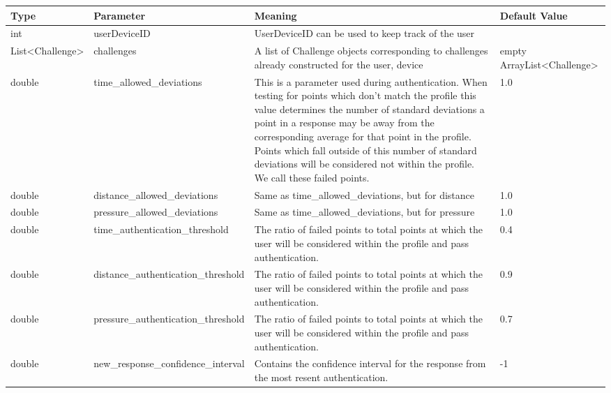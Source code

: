 \documentclass{article} %
\begin{document}
\begin{table}[H]
\centering
\begin{tabular}{ | l | l | p{6.5cm} | p{3cm}|}
\hline

Type & Parameter & Meaning & Default Value \\ \hline

int & userDeviceID & UserDeviceID can be used to keep track of the user & \\ \hline

List\textless Challenge\textgreater & challenges & A list of Challenge objects corresponding to challenges already constructed for the user, device & empty ArrayList\textless Challenge\textgreater \\ \hline

double & time\_allowed\_deviations & This is a parameter used during authentication. When testing for points which don't match the profile this value determines the number of standard deviations a point in a response may be away from the corresponding average for that point in the profile. 
Points which fall outside of this number of standard deviations will be considered not within the profile.
We call these failed points. & 1.0 \\ \hline

double & distance\_allowed\_deviations & Same as time\_allowed\_deviations, but for distance& 1.0 \\ \hline

double & pressure\_allowed\_deviations & Same as time\_allowed\_deviations, but for pressure& 1.0 \\ \hline

double & time\_authentication\_threshold & The ratio of failed points to total points at which the user will be considered within the profile and pass authentication. & 0.4 \\ \hline

double & distance\_authentication\_threshold & The ratio of failed points to total points at which the user will be considered within the profile and pass authentication. & 0.9 \\ \hline

double & pressure\_authentication\_threshold & The ratio of failed points to total points at which the user will be considered within the profile and pass authentication. & 0.7 \\ \hline

double & new\_response\_confidence\_interval & Contains the confidence interval for the response from the most resent authentication. & -1 \\ \hline

\hline
\end{tabular}
\end{table}
\end{document}

